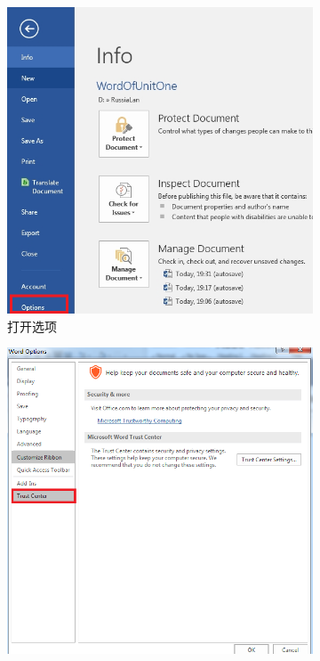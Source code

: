 \documentclass[10.5pt]{ctexart}
\begin{document}
\begin{enumerate}
\begin{figure}[!ht]
\begin{subfigure}[b]{0.4\textwidth}
        \includegraphics[width=\textwidth]{figure2.png}
        \caption{打开选项}
        \label{openOption}
\end{subfigure}
\begin{subfigure}[b]{0.4\textwidth}
        \includegraphics[width=\textwidth]{figure3.png}

\end{subfigure}
\end{figure}
\end{enumerate}
\end{document}
